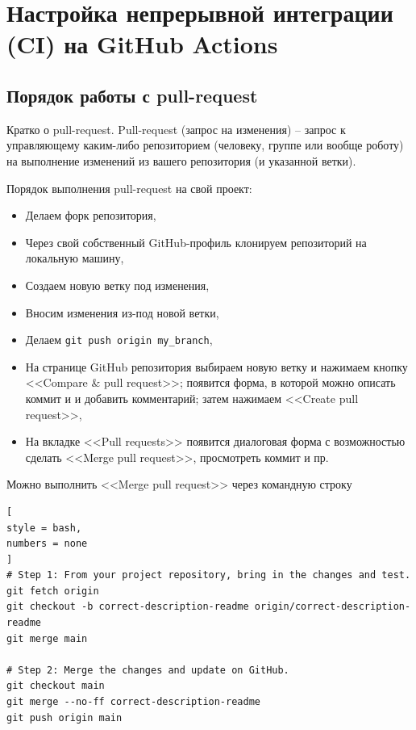 \documentclass[%
	11pt,
	a4paper,
	utf8,
		]{article}
\begin{document}
\section{Настройка непрерывной интеграции (CI) на GitHub Actions}

\subsection{Порядок работы с pull-request}

Кратко о pull-request. Pull-request (запрос на изменения) -- запрос к управляющему каким-либо репозиторием (человеку, группе или вообще роботу) на выполнение изменений из вашего репозитория (и указанной ветки).

Порядок выполнения pull-request на свой проект:
\begin{itemize}
	\item Делаем форк репозитория,
	
	\item Через свой собственный GitHub-профиль клонируем репозиторий на локальную машину,
	
	\item Создаем новую ветку под изменения,
	
	\item Вносим изменения из-под новой ветки,
	
	\item Делаем \texttt{git push origin my\_branch},
	
	\item На странице GitHub репозитория выбираем новую ветку и нажимаем кнопку <<Compare \& pull request>>; появится форма, в которой можно описать коммит и и добавить комментарий; затем нажимаем <<Create pull request>>,
	
	\item На вкладке <<Pull requests>> появится диалоговая форма с возможностью сделать <<Merge pull request>>, просмотреть коммит и пр.
\end{itemize}

Можно выполнить <<Merge pull request>> через командную строку
\begin{lstlisting}[
style = bash,
numbers = none
]
# Step 1: From your project repository, bring in the changes and test.
git fetch origin
git checkout -b correct-description-readme origin/correct-description-readme
git merge main

# Step 2: Merge the changes and update on GitHub.
git checkout main
git merge --no-ff correct-description-readme
git push origin main
\end{lstlisting}
\end{document}
